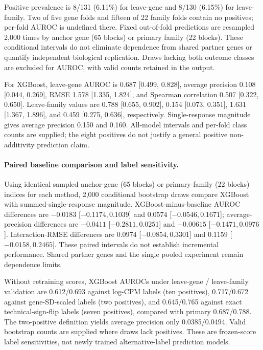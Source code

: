 \documentclass[a4paper,fleqn]{cas-sc}
\makeatletter
\DeclareRobustCommand{\rev}[1]{{\color{red}\def\@citecolor{black}\def\@linkcolor{red}\def\@urlcolor{red}#1}}
\makeatother
\begin{document}
Positive prevalence is 8/131 (6.11\%) for leave-gene and 8/130 (6.15\%) for leave-family. Two of five gene folds and fifteen of 22 family folds contain no positives; per-fold AUROC is undefined there. Fixed out-of-fold predictions are resampled 2,000 times by anchor gene (65 blocks) or primary family (22 blocks). These conditional intervals do not eliminate dependence from shared partner genes or quantify independent biological replication. Draws lacking both outcome classes are excluded for AUROC, with valid counts retained in the output.

For XGBoost, leave-gene AUROC is 0.687 [0.499, 0.828], average precision 0.108 [0.044, 0.269], RMSE 1.578 [1.335, 1.824], and Spearman correlation 0.507 [0.322, 0.650]. Leave-family values are 0.788 [0.655, 0.902], 0.154 [0.073, 0.351], 1.631 [1.367, 1.896], and 0.459 [0.275, 0.636], respectively. Single-response magnitude gives average precision 0.150 and 0.160. \rev{All-model intervals and per-fold class counts are supplied; the eight positives do not justify a general positive non-additivity prediction claim.}

\paragraph{Paired baseline comparison and label sensitivity.}
Using identical sampled anchor-gene (65 blocks) or primary-family (22 blocks) indices for each method, 2,000 conditional bootstrap draws compare XGBoost with summed-single-response magnitude. XGBoost-minus-baseline AUROC differences are $-0.0183$ [$-0.1174,0.1039$] and $0.0574$ [$-0.0546,0.1671$]; average-precision differences are $-0.0411$ [$-0.2811,0.0251$] and $-0.00615$ [$-0.1471,0.0976$]. Interaction-RMSE differences are $0.0974$ [$-0.0854,0.3301$] and $0.1159$ [$-0.0158,0.2465$]. These paired intervals do not establish incremental performance. Shared partner genes and the single pooled experiment remain dependence limits.

Without retraining scores, XGBoost AUROCs under leave-gene / leave-family validation are 0.612/0.693 against log-CPM labels (ten positives), 0.717/0.672 against gene-SD-scaled labels (two positives), and 0.645/0.765 against exact technical-sign-flip labels (seven positives), compared with primary 0.687/0.788. The two-positive definition yields average precision only 0.0385/0.0494. Valid bootstrap counts are supplied where draws lack positives. These are frozen-score label sensitivities, not newly trained alternative-label prediction models.
\end{document}
